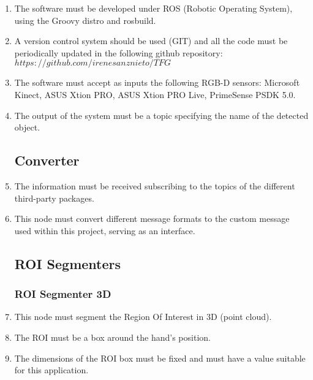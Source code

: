 \documentclass{article}
\makeatletter
\def\threedigits#1{\expandafter\@threedigits\csname c@#1\endcsname}
\def\@threedigits#1{%
  \ifnum#1<100 0\fi
  \ifnum#1<10 0\fi
  \number#1}
\makeatother
\begin{document}
\begin{enumerate}[label=\textbf{FR\threedigits*}, leftmargin=2cm]

	\item The software must be developed under ROS (Robotic Operating System), using the Groovy distro and rosbuild.
	\item A version control system should be used (GIT) and all the code must be periodically updated in the following github repository:  $https://github.com/irenesanznieto/TFG$
	\item The software must accept as inputs the following RGB-D sensors: Microsoft Kinect, ASUS Xtion PRO, ASUS Xtion PRO Live, PrimeSense PSDK 5.0.
	\item The output of the system must be a topic specifying the name of the detected object. 
 
 
\subsection{Converter}

\item The information must be received subscribing to the topics of the different third-party packages. 
\item This node must convert different message formats to the custom message used within this project, serving as an interface. 


\subsection{ROI Segmenters}

   \subsubsection{ROI Segmenter 3D}
	\item This node must segment the Region Of Interest in 3D (point cloud). 
	\item The ROI must be a box around the hand's position. 
	\item The dimensions of the ROI box must be fixed and must have a value suitable for this application.  

\end{enumerate}
\end{document}
